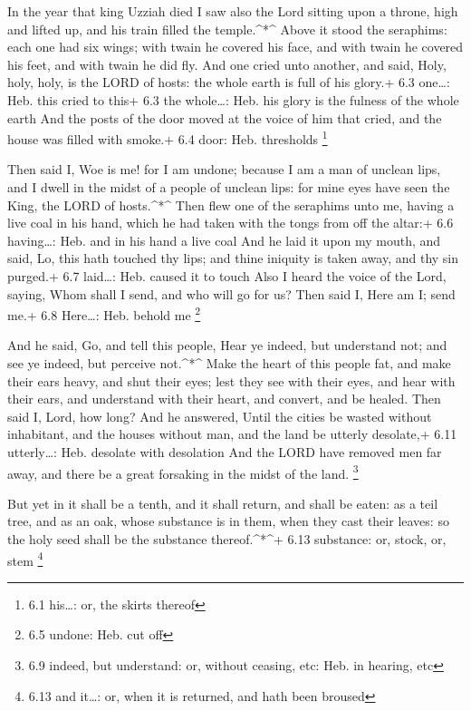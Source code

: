  In the year that king Uzziah died I saw also the Lord
sitting upon a throne, high and lifted up, and his train filled the
temple.\^{}*\^{}  Above it stood the seraphims: each one had
six wings; with twain he covered his face, and with twain he covered his
feet, and with twain he did fly.  And one cried unto
another, and said, Holy, holy, holy, is the LORD of hosts: the whole
earth is full of his glory.+ 6.3 one\ldots: Heb. this cried to this+ 6.3
the whole\ldots: Heb. his glory is the fulness of the whole earth
 And the posts of the door moved at the voice of him that
cried, and the house was filled with smoke.+ 6.4 door: Heb. thresholds
\footnote{6.1 his\ldots: or, the skirts thereof}

 Then said I, Woe is me! for I am undone; because I am a man
of unclean lips, and I dwell in the midst of a people of unclean lips:
for mine eyes have seen the King, the LORD of hosts.\^{}*\^{}
 Then flew one of the seraphims unto me, having a live coal
in his hand, which he had taken with the tongs from off the altar:+ 6.6
having\ldots: Heb. and in his hand a live coal  And he laid
it upon my mouth, and said, Lo, this hath touched thy lips; and thine
iniquity is taken away, and thy sin purged.+ 6.7 laid\ldots: Heb. caused
it to touch  Also I heard the voice of the Lord, saying,
Whom shall I send, and who will go for us? Then said I, Here am I; send
me.+ 6.8 Here\ldots: Heb. behold me \footnote{6.5 undone: Heb. cut off}

 And he said, Go, and tell this people, Hear ye indeed, but
understand not; and see ye indeed, but perceive not.\^{}*\^{}
 Make the heart of this people fat, and make their ears
heavy, and shut their eyes; lest they see with their eyes, and hear with
their ears, and understand with their heart, and convert, and be healed.
 Then said I, Lord, how long? And he answered, Until the
cities be wasted without inhabitant, and the houses without man, and the
land be utterly desolate,+ 6.11 utterly\ldots: Heb. desolate with
desolation  And the LORD have removed men far away, and
there be a great forsaking in the midst of the land. \footnote{6.9
  indeed, but understand: or, without ceasing, etc: Heb. in hearing, etc}

 But yet in it shall be a tenth, and it shall return, and
shall be eaten: as a teil tree, and as an oak, whose substance is in
them, when they cast their leaves: so the holy seed shall be the
substance thereof.\^{}*\^{}+ 6.13 substance: or, stock, or, stem
\footnote{6.13 and it\ldots: or, when it is returned, and hath been
  broused}

